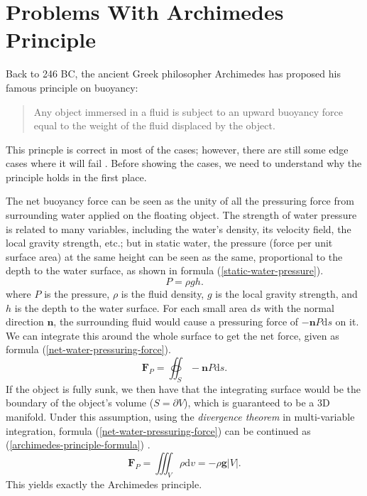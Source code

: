 \section{Problems With Archimedes Principle}

Back to 246 BC, the ancient Greek philosopher Archimedes has proposed his famous principle on buoyancy:
\begin{quote}
	Any object immersed in a fluid is subject to an upward buoyancy force equal to the weight of the fluid displaced by the object.
\end{quote}
This princple is correct in most of the cases;
however, there are still some edge cases where it will fail \cite{bierman2003reconsidering} \cite{mohazzab2017archimedes}.
Before showing the cases, we need to understand why the principle holds in the first place.

The net buoyancy force can be seen as the unity of all the pressuring force from surrounding water applied on the floating object.
The strength of water pressure is related to many variables, including the water's density, its velocity field, the local gravity strength, etc.;
but in static water, the pressure (force per unit surface area) at the same height can be seen as the same, proportional to the depth to the water surface, as shown in formula (\ref{static-water-pressure}).
\begin{equation}
	P=\rho gh.
	\label{static-water-pressure}
\end{equation}
where $P$ is the pressure, $\rho$ is the fluid density, $g$ is the local gravity strength, and $h$ is the depth to the water surface.
For each small area $\mathrm{d}s$ with the normal direction $\mathbf n$, the surrounding fluid would cause a pressuring force of $-\mathbf nP\mathrm{d}s$ on it.
We can integrate this around the whole surface to get the net force, given as formula (\ref{net-water-pressuring-force}).
\begin{equation}
	\mathbf{F}_P=\oiint_{S}-\mathbf nP\mathrm{d}s.
	\label{net-water-pressuring-force}
\end{equation}
If the object is fully sunk, we then have that the integrating surface would be the boundary of the object's volume ($S=\partial V$), which is guaranteed to be a 3D manifold.
Under this assumption, using the \emph{divergence theorem} in multi-variable integration, formula (\ref{net-water-pressuring-force}) can be continued as (\ref{archimedes-principle-formula}) \cite{pfeffer1986divergence}.
\begin{equation}
	\mathbf{F}_P=\iiint_{V}\rho\mathrm{d}v=-\rho\mathbf{g}|V|.
	\label{archimedes-principle-formula}
\end{equation}
This yields exactly the Archimedes principle.

